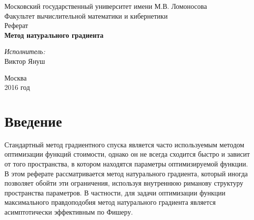 \documentclass[a4paper,12pt]{article}
\begin{document}
\renewcommand{\sfdefault}{ptm}

\newcommand{\sumfromto}[3]{\overset{#2}{\underset{#1}{\sum}}{#3}}

\begin{titlepage}

\newcommand{\HRule}{\rule{\linewidth}{0.5mm}} %

\center 


\Large Московский государственный университет имени М.В. Ломоносова\\[1.5cm]
\Large Факультет вычислительной математики и кибернетики\\[0.5cm]
\large Реферат\\[0.5cm] 

{ \huge \bfseries Метод натурального градиента}\\[0.4cm] %

\begin{flushright} \large
\Large \emph{Исполнитель:}\\
Виктор Януш\\[3cm] 
\end{flushright}

\vfill 

{\large Москва \\ 2016 год}\\[3cm]

\end{titlepage}

 
\tableofcontents
\newpage


\section{Введение}

Стандартный метод градиентного спуска является часто используемым методом оптимизации функций стоимости,
однако он не всегда сходится быстро и зависит от того пространства, в котором находятся параметры
оптимизируемой функции. В этом реферате рассматривается метод натурального градиента, который иногда 
позволяет обойти эти ограничения, используя внутреннюю риманову структуру пространства параметров. 
В частности, для задачи оптимизации функции максимального правдоподобия метод натурального градиента 
является асимптотически эффективным по Фишеру.
\end{document}
